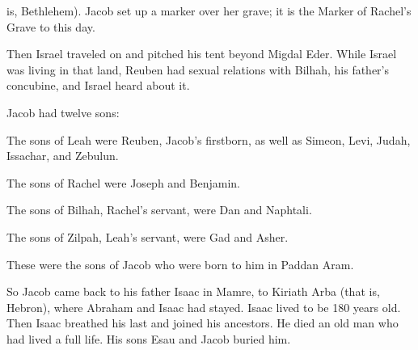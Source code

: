 {is, Bethlehem).
Jacob
set
up a marker
over
her grave;
it is
the Marker
of Rachel’s
Grave
to
this day.
\par }{\PP {}Then Israel
traveled
on and pitched
his tent
beyond
Migdal Eder.
While
Israel
was living in that land,
Reuben
had sexual
relations with Bilhah,
his father’s
concubine,
and Israel
heard
about it.
\par }{\PP Jacob
had twelve
sons:
\par }{\Q {}The sons
of Leah
were Reuben,
Jacob’s
firstborn,
as well as Simeon,
Levi,
Judah,
Issachar,
and Zebulun.
\par }{\Q {}The sons
of Rachel
were Joseph
and Benjamin.
\par }{\Q {}The sons
of Bilhah,
Rachel’s
servant,
were Dan
and Naphtali.
\par }{\Q {}The sons
of Zilpah,
Leah’s
servant,
were Gad
and Asher.
\par }{\PP These
were the sons
of Jacob
who
were born
to him in Paddan Aram.
\par }{\PP {}So Jacob
came
back to
his father
Isaac
in Mamre,
to Kiriath Arba
(that is,
Hebron), where
Abraham
and Isaac
had stayed.
Isaac
lived to be 180
years old.
Then Isaac
breathed his last
and joined
his ancestors.
He died
an old man
who had lived a full
life.
His sons
Esau
and Jacob
buried him.

}
